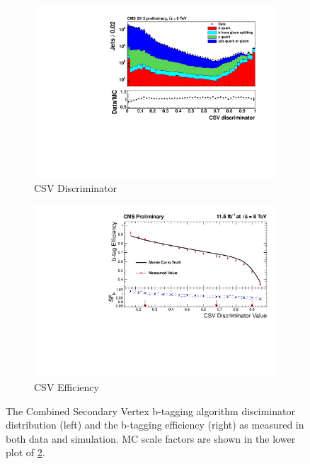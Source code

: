 \begin{figure}[h!]
  \centering
  \begin{subfigure}[b]{0.46\textwidth}
    \includegraphics[width=\textwidth]{Figs/btag/csv_discrim.pdf}
    \caption{CSV Discriminator}
    \label{fig:btag_csv_discrim}
  \end{subfigure}
  \begin{subfigure}[b]{0.46\textwidth}
    \includegraphics[width=\textwidth]{Figs/btag/csv_eff.pdf}
    \caption{CSV Efficiency}
    \label{fig:btag_csv_eff}
  \end{subfigure}
  \caption{The Combined Secondary Vertex b-tagging algorithm disciminator
  distribution (left) and the b-tagging efficiency (right) as measured in both
  data and simulation. MC scale factors are shown in the lower plot of
  \ref{fig:btag_csv_eff}.}
  \label{fig:btag_csv}
\end{figure}

